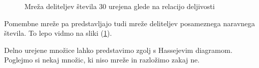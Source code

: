 \documentclass[a4paper]{article}
\begin{document}
\begin{figure}
\centering
{}
\caption{Mreža deliteljev števila $30$ urejena glede na relacijo deljivosti}
\label{im:divisors_of_30_hasse_diagram}
\end{figure}

Pomembne mreže pa predstavljajo tudi mreže deliteljev posameznega naravnega števila. To lepo vidmo na sliki (\ref{im:divisors_of_30_hasse_diagram}).

Delno urejene množice lahko predstavimo zgolj s Hassejevim diagramom. Poglejmo si nekaj množic, ki niso mreže in razložimo zakaj ne.
\end{document}
